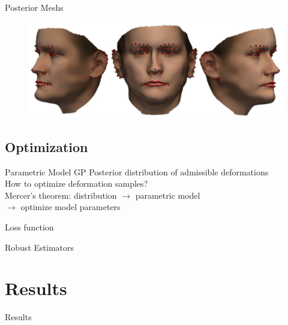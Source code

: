 \documentclass[xcolor=x11names,compress]{beamer}
\begin{document}
\begin{frame}{Posterior Meshs}
    \begin{figure}
        \centering
        \includegraphics[width=.6\textwidth]{../resources/img/posterior_sample_17.pdf}
    \end{figure}
\end{frame}

\subsection{Optimization}
\begin{frame}{Parametric Model}
    GP Posterior distribution of admissible deformations\\
    How to optimize deformation samples?\\
    Mercer's theorem: distribution $\rightarrow$ parametric model\\
    $\rightarrow$ optimize model parameters
\end{frame}

\begin{frame}{Loss function}

\end{frame}

\begin{frame}{Robust Estimators}
\end{frame}

\section{Results}
\begin{frame}{Results}

\end{frame}
\end{document}
